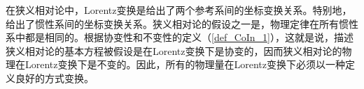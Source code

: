 
在狭义相对论中，Lorentz变换是给出了两个参考系间的坐标变换关系。特别地，给出了惯性系间的坐标变换关系。狭义相对论的假设之一是，物理定律在所有惯性系中都是相同的。根据协变性和不变性的定义（\autoref{def_CoIn_1}），这就是说，描述狭义相对论的基本方程被假设是在Lorentz变换下是协变的，因而狭义相对论的物理在Lorentz变换下是不变的。因此，所有的物理量在Lorentz变换下必须以一种定义良好的方式变换。